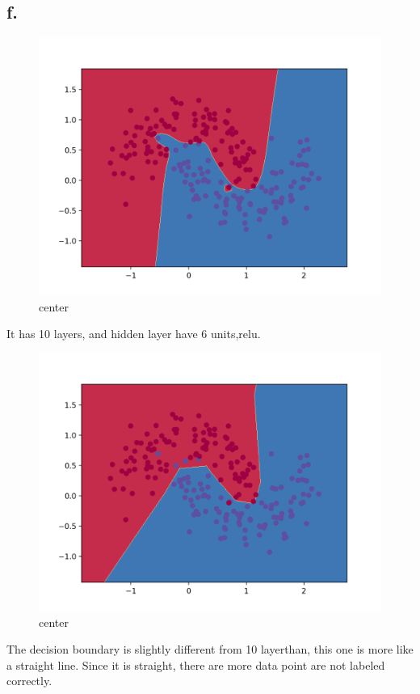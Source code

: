 \documentclass[12pt]{article}
\begin{document}
\subsection{f.}
\begin{figure}[H]
  \caption{center}
  \centering
    \includegraphics[scale=0.2]{6layer10tanh.png}
\end{figure}
It has 10 layers, and hidden layer have 6 units,relu.
\begin{figure}[H]
  \caption{center}
  \centering
    \includegraphics[scale=0.2]{6layer10relu.png}
\end{figure}
The decision boundary is slightly different from 10 layerthan, this one is more like a straight line. Since it is straight, there are more data point are not labeled correctly.
\end{document}
